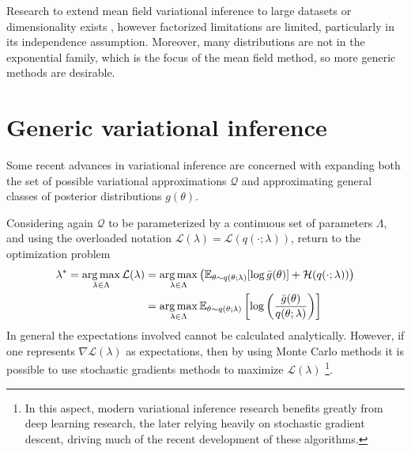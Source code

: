 Research to extend mean field variational inference to large datasets or dimensionality exists \cite{Hensman_2012,Hoffman_2013,Zhang_2019}, however factorized limitations are limited, particularly in its independence assumption. Moreover, many distributions are not in the exponential family, which is the focus of the mean field method, so more generic methods are desirable.

\section{Generic variational inference}
Some recent advances in variational inference \cite{Zhang_2019} are concerned with expanding both the set of possible variational approximations $\mathcal{Q}$ and approximating general classes of posterior distributions $g(\theta)$. 

Considering again $\mathcal{Q}$ to be parameterized by a continuous set of parameters $\Lambda$, and using the overloaded notation $\mathcal{L}(\lambda) = \mathcal{L}(q(\cdot;\lambda))$, return to the optimization problem 
\begin{equation}
\begin{split}
\lambda^* = \operatorname*{arg\,max}_{\lambda \in \Lambda} \mathcal{L}(\lambda) & = \operatorname*{arg\,max}_{\lambda \in \Lambda} \left( {\mathbb E}_{\theta \sim q(\theta;\lambda)}[\log {\bar{g}}(\theta)] + \mathcal{H}(q(\cdot;\lambda)) \right)\\
& =  \operatorname*{arg\,max}_{\lambda \in \Lambda} {\mathbb E}_{\theta \sim q(\theta;\lambda)}\left[\log \left(\frac{{\bar{g}}(\theta)}{q(\theta;\lambda)}\right)\right]
\end{split}
\end{equation}
In general the expectations involved cannot be calculated analytically. However, if one represents $\nabla \mathcal{L}(\lambda)$ as expectations, then by using Monte Carlo methods it is possible to use stochastic gradients methods \cite{Robbins_1951,Kingma_2014,Qian_1999,Ruder_2016} to maximize $\mathcal{L}(\lambda)$ \footnote{In this aspect, modern variational inference research benefits greatly from deep learning research, the later relying heavily on stochastic gradient descent, driving much of the recent development of these algorithms.}.

